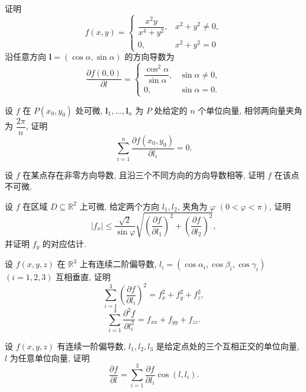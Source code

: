 \documentclass[../数学分析培优讲义.tex]{subfiles}
\begin{document}
\begin{example}
证明
\[
    f(x,y)=
    \begin{cases}
        \dfrac{x^2y}{x^4+y^2}, & x^2+y^2\ne0,\\
        0, & x^2+y^2=0
    \end{cases}
\]
沿任意方向 $\bm l=(\cos\alpha,\sin\alpha)$ 的方向导数为
\[
    \dfrac{\partial f(0,0)}{\partial l}
    =\begin{cases}
        \dfrac{\cos^2\alpha}{\sin\alpha}, & \sin\alpha\ne0,\\
        0, & \sin\alpha=0.
    \end{cases}
\]
\end{example}
\exampleblank

\begin{example}
设 $f$ 在 $P(x_0,y_0)$ 处可微, $\bm l_1,\ldots,\bm l_n$ 为 $P$ 处给定的 $n$ 个单位向量, 相邻两向量夹角为 $\dfrac{2\pi}{n}$, 证明
\[
    \sum\limits_{i=1}^n\dfrac{\partial f(x_0,y_0)}{\partial l_i}=0.
\]
\end{example}
\exampleblank

\begin{example}
设 $f$ 在某点存在非零方向导数, 且沿三个不同方向的方向导数相等, 证明 $f$ 在该点不可微.
\end{example}
\exampleblank

\begin{example}
设 $f$ 在区域 $D\subseteq\mathbb{R}^2$ 上可微, 给定两个方向 $l_1,l_2$, 夹角为 $\varphi$ $(0<\varphi<\pi)$, 证明
\[
    |f_x|\leq\dfrac{\sqrt2}{\sin\varphi}
    \sqrt{\left(\dfrac{\partial f}{\partial l_1}\right)^2+
    \left(\dfrac{\partial f}{\partial l_2}\right)^2},
\]
并证明 $f_y$ 的对应估计.
\end{example}
\exampleblank

\begin{example}
设 $f(x,y,z)$ 在 $\mathbb{R}^3$ 上有连续二阶偏导数, $l_i=(\cos\alpha_i,\cos\beta_i,\cos\gamma_i)$ $(i=1,2,3)$ 互相垂直, 证明
\[
    \sum\limits_{i=1}^3\left(\dfrac{\partial f}{\partial l_i}\right)^2
    =f_x^2+f_y^2+f_z^2,
\]
\[
    \sum\limits_{i=1}^3\dfrac{\partial^2f}{\partial l_i^2}
    =f_{xx}+f_{yy}+f_{zz}.
\]
\end{example}
\exampleblank

\begin{example}[\markstar]
设 $f(x,y,z)$ 有连续一阶偏导数, $l_1,l_2,l_3$ 是给定点处的三个互相正交的单位向量, $l$ 为任意单位向量, 证明
\[
    \dfrac{\partial f}{\partial l}
    =\sum\limits_{i=1}^3\dfrac{\partial f}{\partial l_i}\cos(l,l_i).
\]
\end{example}
\exampleblank
\end{document}
